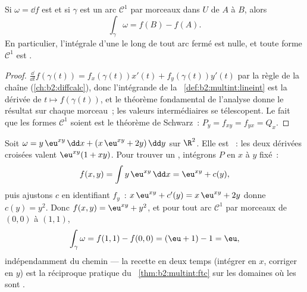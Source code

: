 \begin{theorem}\label{thm:b2:multint:ftc}
Si $\omega = \dd f$ est  et si $\gamma$ est un arc $\mathcal{C}^1$
par morceaux dans $U$ de $A$ à $B$, alors
\[
\int_\gamma \omega = f(B) - f(A) .
\]
En particulier, l'intégrale d'une  le long de tout arc
fermé est nulle, et toute forme $\mathcal{C}^1$  est .
\end{theorem}

\begin{proof}
$\frac{\dd}{\dd t}f(\gamma(t)) = f_x(\gamma(t))x'(t) +
f_y(\gamma(t))y'(t)$ par la règle de la chaîne
(\cref{ch:b2:diffcalc}), donc l'intégrande de la~%
\cref{def:b2:multint:lineint} est la dérivée de $t \mapsto
f(\gamma(t))$, et le théorème fondamental de l'analyse donne le
résultat sur chaque morceau~; les valeurs intermédiaires se
télescopent. Le fait que les formes $\mathcal{C}^1$  soient
 est le théorème de Schwarz~: $P_y =
f_{xy} = f_{yx} = Q_x$.
\end{proof}

\begin{example}\label{ex:b2:multint:potential}
Soit $\omega = y\,\eu^{xy}\,\dd x + (x\,\eu^{xy} + 2y)\,\dd y$
sur $\R^2$. Elle est ~: les deux dérivées croisées valent
$\eu^{xy}(1 + xy)$. Pour trouver un , intégrons $P$ en
$x$ à $y$ fixé~:
\[
f(x, y) = \int y\,\eu^{xy}\,\dd x = \eu^{xy} + c(y),
\]
puis ajustons $c$ en identifiant $f_y$~: $x\,\eu^{xy} + c'(y) =
x\,\eu^{xy} + 2y$ donne $c(y) = y^2$. Donc $f(x,y) = \eu^{xy} +
y^2$, et pour tout arc $\mathcal C^1$ par morceaux de $(0,0)$
à $(1,1)$,
\[
\int_\gamma\omega = f(1,1) - f(0,0) = (\eu + 1) - 1 = \eu ,
\]
indépendamment du chemin --- la recette en deux temps (intégrer
en $x$, corriger en $y$) est la réciproque pratique du~%
\cref{thm:b2:multint:ftc} sur les domaines où les  sont
.
\end{example}

